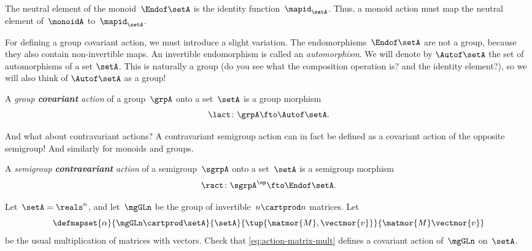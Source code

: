 The neutral element of the monoid~$\Endof\setA$ is the identity function~$\mapid_{\setA}$.
Thus, a monoid action must map the neutral element of~$\monoidA$ to~$\mapid_{\setA}$.
%

For defining a group covariant action, we must introduce a slight variation.
The endomorphisms~$\Endof\setA$ are not a group, because they also contain non-invertible maps. An invertible endomorphism is called an \emph{automorphism}. We will denote by $\Autof\setA$ the set of automorphisms of a set $\setA$. This is naturally a group (do you see what the composition operation is? and the identity element?), so we will also think of $\Autof\setA$ as a group!



\begin{ctdefinition}
    \label{def:group-cov-action}
    A \emph{group \textbf{covariant} action} of a group~$\grpA$ onto a set~$\setA$ is a group morphism
    \begin{equation}
        \label{eq:act-group}
        \lact \colon \grpA \fto \Autof\setA.
    \end{equation}
\end{ctdefinition}

And what about contravariant actions?
A contravariant semigroup action can in fact be defined as a covariant action of the opposite semigroup!
And similarly for monoids and groups.

\begin{ctdefinition}
    \label{def:semigroup-cont-action}
    A \emph{semigroup \textbf{contravariant} action} of a semigroup~$\sgrpA$ onto a set~$\setA$ is a semigroup morphism
    \begin{equation}
        \ract \colon \sgrpA^{\op} \fto \Endof\setA.
    \end{equation}
\end{ctdefinition}

\vfill%


\begin{gradedexercise}
    \label{ex:MatrixMultAction}
    Let~$\setA = \reals^n$, and let~$\mgGLn$ be the group of invertible~$n \cartprod n$ matrices.
    Let
    \begin{equation}
        \label{eq:action-matrix-mult}
        \defmapset{
            \alpha
        }{
            \mgGLn \cartprod \setA
        }{
            \setA
        }{
            \tup{\matmor{M}, \vectmor{v}}
        }{
            \matmor{M}\vectmor{v}
        }
    \end{equation}
    be the usual multiplication of matrices with vectors.
    Check that \cref{eq:action-matrix-mult} defines a covariant action of~$\mgGLn$ on~$\setA$.
\end{gradedexercise}

